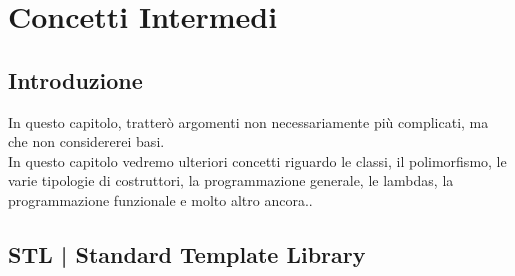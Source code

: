 
\chapter{Concetti Intermedi}












\section{Introduzione}

\textsf{\small In questo capitolo, tratterò argomenti non necessariamente più complicati, ma che non considererei basi. } \\

\textsf{\small In questo capitolo vedremo ulteriori concetti riguardo le classi, il polimorfismo, le varie tipologie di costruttori, la programmazione generale, le lambdas, la programmazione funzionale e molto altro ancora..} \break



\section{STL | Standard Template Library}

